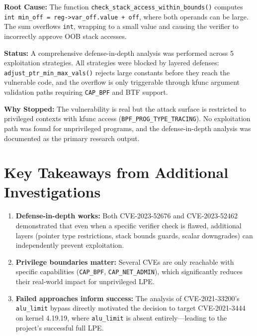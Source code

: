 \textbf{Root Cause:} The function \texttt{check\_stack\_access\_within\_bounds()} computes \texttt{int min\_off = reg->var\_off.value + off}, where both operands can be large. The sum overflows \texttt{int}, wrapping to a small value and causing the verifier to incorrectly approve OOB stack accesses.

\textbf{Status:} A comprehensive defense-in-depth analysis was performed across 5 exploitation strategies. All strategies were blocked by layered defenses: \texttt{adjust\_ptr\_min\_max\_vals()} rejects large constants before they reach the vulnerable code, and the overflow is only triggerable through kfunc argument validation paths requiring \texttt{CAP\_BPF} and BTF support.

\textbf{Why Stopped:} The vulnerability is real but the attack surface is restricted to privileged contexts with kfunc access (\texttt{BPF\_PROG\_TYPE\_TRACING}). No exploitation path was found for unprivileged programs, and the defense-in-depth analysis was documented as the primary research output.


\section{Key Takeaways from Additional Investigations}

\begin{enumerate}
    \item \textbf{Defense-in-depth works:} Both CVE-2023-52676 and CVE-2023-52462 demonstrated that even when a specific verifier check is flawed, additional layers (pointer type restrictions, stack bounds guards, scalar downgrades) can independently prevent exploitation.
    \item \textbf{Privilege boundaries matter:} Several CVEs are only reachable with specific capabilities (\texttt{CAP\_BPF}, \texttt{CAP\_NET\_ADMIN}), which significantly reduces their real-world impact for unprivileged LPE.
    \item \textbf{Failed approaches inform success:} The analysis of CVE-2021-33200's \texttt{alu\_limit} bypass directly motivated the decision to target CVE-2021-3444 on kernel 4.19.19, where \texttt{alu\_limit} is absent entirely—leading to the project's successful full LPE.
\end{enumerate}
